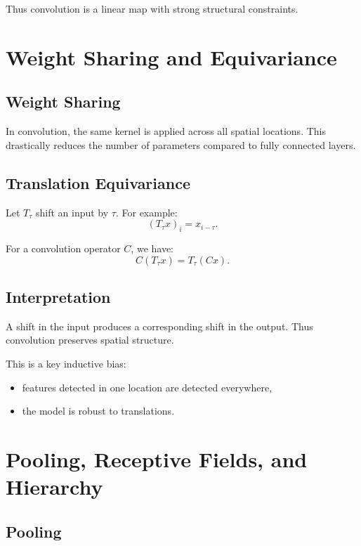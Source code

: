 Thus convolution is a linear map with strong structural constraints.

\section{Weight Sharing and Equivariance}

\subsection{Weight Sharing}

In convolution, the same kernel is applied across all spatial locations. This drastically reduces the number of parameters compared to fully connected layers.

\subsection{Translation Equivariance}

\begin{definition}
Let $T_\tau$ shift an input by $\tau$. For example:
\[
(T_\tau x)_i = x_{i-\tau}.
\]
\end{definition}

\begin{proposition}
For a convolution operator $C$, we have:
\[
C(T_\tau x) = T_\tau (C x).
\]
\end{proposition}

\subsection{Interpretation}

A shift in the input produces a corresponding shift in the output. Thus convolution preserves spatial structure.

This is a key inductive bias:
\begin{itemize}
    \item features detected in one location are detected everywhere,
    \item the model is robust to translations.
\end{itemize}

\section{Pooling, Receptive Fields, and Hierarchy}

\subsection{Pooling}

